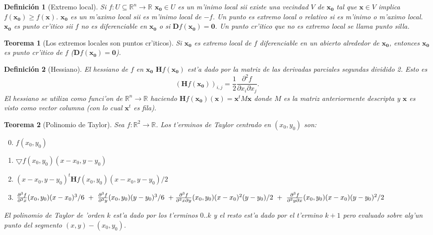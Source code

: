 \documentclass[a4paper,spanish]{article}
\newcommand{\R}[0]{\mathbb{R}}
\newcommand{\xx}[0]{\mathbf{x}}
\newcommand{\xO}[0]{\mathbf{x_0}}
\newcommand{\parcial}[2]{\frac{\partial #1}{\partial #2}}
\newcommand{\D}[0]{\mathbf{D}}
\newcommand{\He}[0]{\mathbf{H}}
\newcommand{\grad}[0]{\bigtriangledown}
\newtheorem{teo}{Teorema}
\newtheorem{defi}{Definici\'on}
\begin{document}
\begin{defi}[Extremo local]
\label{def-extremo-local}
Si $f : U \subseteq \R^n \to \R$ $\xO \in U$ es un \emph{m'inimo local} sii
existe una vecindad $V$ de $\xO$ tal que $\xx \in V$ implica 
$f(\xO) \geq f(\xx)$.
$\xO$ es un \emph{m'aximo local} sii es m'inimo local de $-f$. Un punto es
\emph{extremo local o relativo} si es m'inimo o m'aximo local. $\xO$ es 
\emph{punto cr'itico} sii $f$ no es diferenciable en $\xO$ o si 
$\D f(\xO) = \mathbf{0}$. Un punto cr'itico que no es extremo local se llama
\emph{punto silla}.
\end{defi}

\begin{teo}[Los extremos locales son puntos cr'iticos]
\label{teo-extremo-local}
Si $\xO$ es extremo local de $f$ diferenciable en un abierto alrededor de 
$\xO$, entonces $\xO$ es punto cr'itico de $f$ ($\D f(\xO) = \mathbf{0}$).
\end{teo}

\begin{defi}[Hessiano]
\label{def-hessiano}
El \emph{hessiano} de $f$ en $\xO$ $\He f(\xO)$ est'a dado por la matriz de las 
derivadas parciales segundas dividido 2. Esto es 
$$(\He f(\xO))_{i,j} = \frac{1}{2}\parcial{^2 f}{x_i \partial x_j}.$$
El hessiano se utiliza como funci'on de $\R^n \to \R$ haciendo 
$\He f(\xO)(\xx) = \xx^t M \xx$ donde $M$ es la matriz anteriormente descripta y 
$\xx$ es visto como vector columna (con lo cual $\xx^t$ es fila).
\end{defi}

\begin{teo}[Polinomio de Taylor]
Sea $f : \R^2 \to \R$. Los \emph{t'erminos de Taylor} centrado en $(x_0,y_0)$ 
son:
\begin{enumerate}
\setcounter{enumi}{-1}
\item $f(x_0,y_0)$
\item $\grad f(x_0,y_0) (x - x_0, y - y_0)$
\item $(x - x_0, y - y_0)^t \He f(x_0,y_0) (x - x_0, y - y_0) / 2$
\item $\parcial{^3 f}{^3 x}(x_0,y_0) (x - x_0)^3 / 6\ +\ 
       \parcial{^3 f}{^3 y}(x_0,y_0) (y - y_0)^3 / 6\ +\\
       \parcial{^3 f}{^2 x \partial y}(x_0,y_0) (x - x_0)^2(y - y_0) / 2\ +\ 
       \parcial{^3 f}{^2 y \partial x}(x_0,y_0) (x - x_0)(y - y_0)^2 / 2$
\end{enumerate}
El \emph{polinomio de Taylor} de 'orden $k$ est'a dado por los t'erminos 
$0..k$ y el resto est'a dado por el t'ermino $k+1$ pero evaluado sobre alg'un 
punto del segmento $(x,y)-(x_0,y_0)$.
\end{teo}
\end{document}
